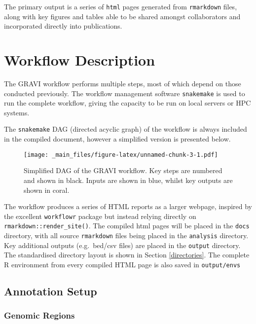 \documentclass[
]{book}
\begin{document}
The primary output is a series of \texttt{html} pages generated from \texttt{rmarkdown} files, along with key figures and tables able to be shared amongst collaborators and incorporated directly into publications.

\hypertarget{workflow}{%
\chapter{Workflow Description}\label{workflow}}

The GRAVI workflow performs multiple steps, most of which depend on those conducted previously.
The workflow management software \texttt{snakemake}\citep{snakemake} is used to run the complete workflow, giving the capacity to be run on local servers or HPC systems.

The \texttt{snakemake} DAG (directed acyclic graph) of the workflow is always included in the compiled document, however a simplified version is presented below.

\begin{figure}
\centering
\texttt{[image: \_main\_files/figure-latex/unnamed-chunk-3-1.pdf]}
\caption{\label{fig:unnamed-chunk-3}Simplified DAG of the GRAVI workflow. Key steps are numbered and shown in black. Inputs are shown in blue, whilst key outputs are shown in coral.}
\end{figure}

The workflow produces a series of HTML reports as a larger webpage, inspired by the excellent \texttt{workflowr}\citep{workflowr} package but instead relying directly on \texttt{rmarkdown::render\_site()}\citep{R-rmarkdown}.
The compiled html pages will be placed in the \texttt{docs} directory, with all source \texttt{rmarkdown} files being placed in the \texttt{analysis} directory.
Key additional outputs (e.g.~bed/csv files) are placed in the \texttt{output} directory.
The standardised directory layout is shown in Section \ref{directories}.
The complete R environment from every compiled HTML page is also saved in \texttt{output/envs}

\hypertarget{annotation}{%
\section{Annotation Setup}\label{annotation}}

\hypertarget{genomic-regions}{%
\subsection*{Genomic Regions}\label{genomic-regions}}
\end{document}
